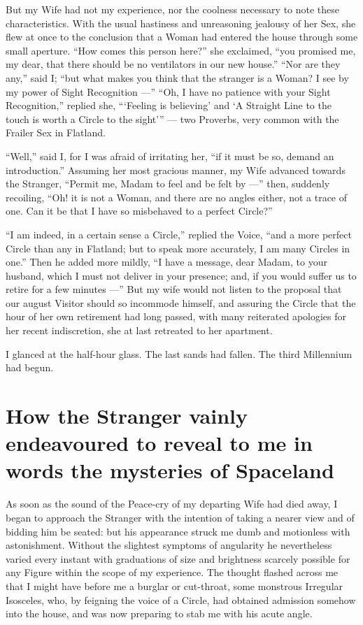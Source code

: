 \documentclass[12pt, a4paper, twoside]{memoir}
\begin{document}
But my Wife had not my experience, nor the coolness necessary to note these
characteristics. With the usual hastiness and unreasoning jealousy of her Sex,
she flew at once to the conclusion that a Woman had entered the house through
some small aperture. ``How comes this person here?'' she exclaimed, ``you
promised me, my dear, that there should be no ventilators in our new house.''
``Nor are they any,'' said I; ``but what makes you think that the stranger is a
Woman? I see by my power of Sight Recognition ---'' ``Oh, I have no patience with
your Sight Recognition,'' replied she, ```Feeling is believing' and `A Straight
Line to the touch is worth a Circle to the sight''' --- two Proverbs, very common
with the Frailer Sex in Flatland.

``Well,'' said I, for I was afraid of irritating her, ``if it must be so, demand
an introduction.'' Assuming her most gracious manner, my Wife advanced towards
the Stranger, ``Permit me, Madam to feel and be felt by ---'' then, suddenly
recoiling, ``Oh! it is not a Woman, and there are no angles either, not a trace
of one. Can it be that I have so misbehaved to a perfect Circle?''

``I am indeed, in a certain sense a Circle,'' replied the Voice, ``and a more
perfect Circle than any in Flatland; but to speak more accurately, I am many
Circles in one.'' Then he added more mildly, ``I have a message, dear Madam, to
your husband, which I must not deliver in your presence; and, if you would
suffer us to retire for a few minutes ---'' But my wife would not listen to the
proposal that our august Visitor should so incommode himself, and assuring the
Circle that the hour of her own retirement had long passed, with many
reiterated apologies for her recent indiscretion, she at last retreated to her
apartment.

I glanced at the half-hour glass. The last sands had fallen. The third
Millennium had begun.





\chapter{How the Stranger vainly endeavoured to reveal to me in words the mysteries of Spaceland}
As soon as the sound of the Peace-cry of my departing Wife had died away, I
began to approach the Stranger with the intention of taking a nearer view and
of bidding him be seated: but his appearance struck me dumb and motionless
with astonishment. Without the slightest symptoms of angularity he
nevertheless varied every instant with graduations of size and brightness
scarcely possible for any Figure within the scope of my experience. The
thought flashed across me that I might have before me a burglar or cut-throat,
some monstrous Irregular Isosceles, who, by feigning the voice of a Circle,
had obtained admission somehow into the house, and was now preparing to stab
me with his acute angle.
\end{document}
